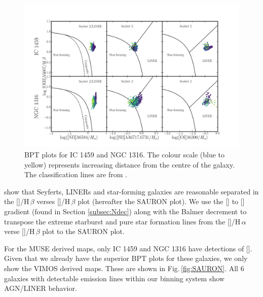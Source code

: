 		\begin{figure}
			\centering
			\includegraphics[width=\textwidth]{chapter5/BPT.png}
			\caption[BPT plots]{BPT plots for IC 1459 and NGC 1316. The colour scale (blue to yellow) represents increasing distance from the centre of the galaxy. The classification lines are from \citet{Kewley2006}.}
			\label{fig:BPT}
		\end{figure}

		\citet{Sarzi2010} show that Seyferts, LINERs and star-forming galaxies are reasonable separated in the []/H\,$\beta$ verses []/H\,$\beta$ plot (hereafter the SAURON plot). We use the [] to [] gradient (found in Section \ref{subsec:Ndec}) along with the Balmer decrement to transpose the \citet{Kewley2001} extreme starburst and \citet{Kauffmann2003a} pure star formation lines from the []/H\,$\alpha$ verse []/H\,$\beta$ plot to the SAURON plot.

		For the MUSE derived maps, only IC 1459 and NGC 1316 have detections of []. Given that we already have the superior BPT plots for these galaxies, we only show the VIMOS derived maps. These are shown in Fig.\,\ref{fig:SAURON}. All 6 galaxies with detectable emission lines within our binning system show AGN/LINER behavior.

